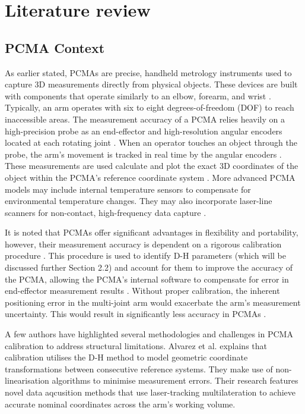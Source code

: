 \chapter{Literature review}

\section{PCMA Context}

As earlier stated, PCMAs are precise, handheld metrology instruments used to capture 3D measurements directly from physical objects. These devices are built with components that operate similarly to an elbow, forearm, and wrist \citep{Meagher:2016}. Typically, an arm operates with six to eight degrees-of-freedom (DOF) to reach inaccessible areas. The measurement accuracy of a PCMA relies heavily on a high-precision probe as an end-effector and high-resolution angular encoders located at each rotating joint \citep{Meagher:2016}. When an operator touches an object through the probe, the arm's movement is tracked in real time by the angular encoders \citep{Leussink:2024}. These measurements are used calculate and plot the exact 3D coordinates of the object within the PCMA's reference coordinate system \citep{Leussink:2024}. More advanced PCMA models may include internal temperature sensors to compensate for environmental temperature changes. They may also incorporate laser-line scanners for non-contact, high-frequency data capture \citep{Meagher:2016}.

It is noted that PCMAs offer significant advantages in flexibility and portability, however, their measurement accuracy is dependent on a rigorous calibration procedure \citep{Brau:2014}. This procedure is used to identify D-H parameters (which will be discussed further Section 2.2) and account for them to improve the accuracy of the PCMA, allowing the PCMA's internal software to compensate for error in end-effector measurement results \citep{Alvarez:2015}. Without proper calibration, the inherent positioning error in the multi-joint arm would exacerbate the arm's measurement uncertainty. This would result in significantly less accuracy in PCMAs \citep{Alvarez:2015}.

A few authors have highlighted several methodologies and challenges in PCMA calibration to address structural limitations. Alvarez et al. \citep{Alvarez:2015} explains that calibration utilises the D-H method to model geometric coordinate transformations between consecutive reference systems. They make use of non-linearisation algorithms to minimise measurement errors. Their research features novel data aqcusition methods that use laser-tracking multilateration to achieve accurate nominal coordinates across the arm's working volume.

